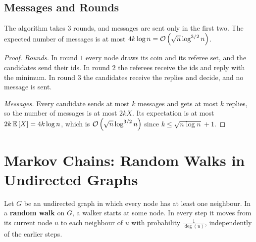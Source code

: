 % 

\subsection{Messages and Rounds}

\begin{theorem}\label{thm:complexity-0908}
    The algorithm takes $3$ rounds, and messages are sent only in the first two. The expected number
    of messages is at most $4 k \log n = \mathcal{O}\left(\sqrt{n} \log^{3/2} n\right)$.
\end{theorem}

\begin{proof}
    \emph{Rounds.} In round $1$ every node draws its coin and its referee set, and the candidates
    send their ids. In round $2$ the referees receive the ids and reply with the minimum. In round
    $3$ the candidates receive the replies and decide, and no message is sent.

    \emph{Messages.} Every candidate sends at most $k$ messages and gets at most $k$ replies, so the
    number of messages is at most $2kX$. Its expectation is at most $2k \expectation{X} = 4 k \log n$,
    which is $\mathcal{O}\left(\sqrt{n} \log^{3/2} n\right)$ since $k \leq \sqrt{n \log n} + 1$.
\end{proof}

\section{Markov Chains: Random Walks in Undirected Graphs}

\begin{definition}
    Let $G$ be an undirected graph in which every node has at least one neighbour. In a
    \textbf{random walk} on $G$, a walker starts at some node. In every step it moves from its
    current node $u$ to each neighbour of $u$ with probability $\frac{1}{\deg(u)}$, independently
    of the earlier steps.
\end{definition}

